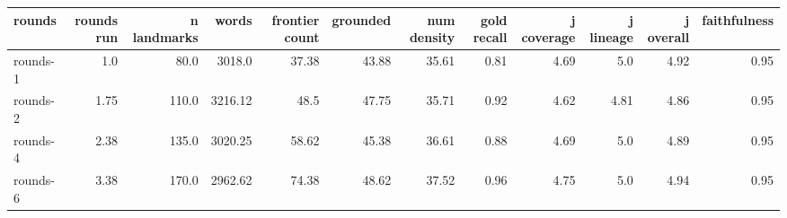 \begin{tabular}{lrrrrrrrrrrr}
\toprule
rounds & rounds run & n landmarks & words & frontier count & grounded & num density & gold recall & j coverage & j lineage & j overall & faithfulness \\
\midrule
rounds-1 & 1.0 & 80.0 & 3018.0 & 37.38 & 43.88 & 35.61 & 0.81 & 4.69 & 5.0 & 4.92 & 0.95 \\
rounds-2 & 1.75 & 110.0 & 3216.12 & 48.5 & 47.75 & 35.71 & 0.92 & 4.62 & 4.81 & 4.86 & 0.95 \\
rounds-4 & 2.38 & 135.0 & 3020.25 & 58.62 & 45.38 & 36.61 & 0.88 & 4.69 & 5.0 & 4.89 & 0.95 \\
rounds-6 & 3.38 & 170.0 & 2962.62 & 74.38 & 48.62 & 37.52 & 0.96 & 4.75 & 5.0 & 4.94 & 0.95 \\
\bottomrule
\end{tabular}
